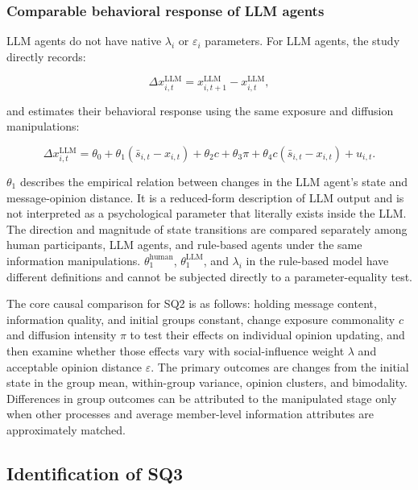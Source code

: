 \documentclass[11pt,a4paper]{article}
\begin{document}
\subsubsection{Comparable behavioral response of LLM agents}

LLM agents do not have native $\lambda_i$ or $\varepsilon_i$ parameters. For LLM agents, the study directly records:

\begin{equation*}
\Delta x^{\text{LLM}}_{i,t}
=
x^{\text{LLM}}_{i,t+1}
-
x^{\text{LLM}}_{i,t},
\end{equation*}

and estimates their behavioral response using the same exposure and diffusion manipulations:

\begin{equation*}
\Delta x^{\text{LLM}}_{i,t}
=
\theta_0
+
\theta_1(\bar s_{i,t}-x_{i,t})
+
\theta_2c
+
\theta_3\pi
+
\theta_4c(\bar s_{i,t}-x_{i,t})
+
u_{i,t}.
\end{equation*}

$\theta_1$ describes the empirical relation between changes in the LLM agent's state and message-opinion distance. It is a reduced-form description of LLM output and is not interpreted as a psychological parameter that literally exists inside the LLM. The direction and magnitude of state transitions are compared separately among human participants, LLM agents, and rule-based agents under the same information manipulations. $\theta_1^{\text{human}}$, $\theta_1^{\text{LLM}}$, and $\lambda_i$ in the rule-based model have different definitions and cannot be subjected directly to a parameter-equality test.

The core causal comparison for SQ2 is as follows: holding message content, information quality, and initial groups constant, change exposure commonality $c$ and diffusion intensity $\pi$ to test their effects on individual opinion updating, and then examine whether those effects vary with social-influence weight $\lambda$ and acceptable opinion distance $\varepsilon$. The primary outcomes are changes from the initial state in the group mean, within-group variance, opinion clusters, and bimodality. Differences in group outcomes can be attributed to the manipulated stage only when other processes and average member-level information attributes are approximately matched.

\subsection{Identification of SQ3}
\end{document}
